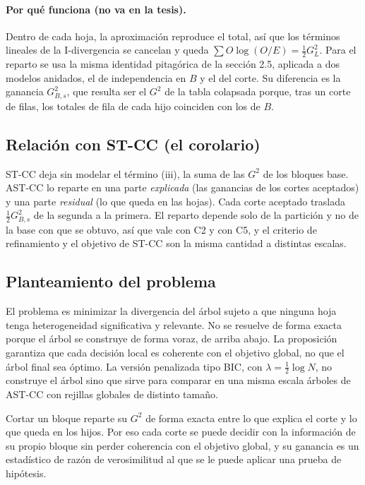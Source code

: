 \documentclass[11pt,a4paper]{article}
\newenvironment{idea}{\par\begin{center}\begin{lrbox}{\ideabox}\begin{minipage}{0.9\linewidth}}{\end{minipage}\end{lrbox}\fcolorbox{blue!40!black}{blue!5}{\usebox{\ideabox}}\end{center}}
\begin{document}
\paragraph{Por qué funciona (no va en la tesis).} Dentro de cada hoja, la
aproximación reproduce el total, así que los términos lineales de la I-divergencia
se cancelan y queda $\sum O\log(O/E)=\tfrac12G^2_L$. Para el reparto se usa la
misma identidad pitagórica de la sección 2.5, aplicada a dos modelos anidados, el
de independencia en $B$ y el del corte. Su diferencia es la ganancia
$G^2_{B,s}$, que resulta ser el $G^2$ de la tabla colapsada porque, tras un corte de
filas, los totales de fila de cada hijo coinciden con los de $B$.

\subsection{Relación con ST-CC (el corolario)}

ST-CC deja sin modelar el término (iii), la suma de las $G^2$ de los bloques base.
AST-CC lo reparte en una parte \emph{explicada} (las ganancias de los cortes
aceptados) y una parte \emph{residual} (lo que queda en las hojas). Cada corte
aceptado traslada $\tfrac12G^2_{B,s}$ de la segunda a la primera. El reparto
depende solo de la partición y no de la base con que se obtuvo, así que vale con C2
y con C5, y el criterio de refinamiento y el objetivo de ST-CC son la misma
cantidad a distintas escalas.

\subsection{Planteamiento del problema}

El problema es minimizar la divergencia del árbol sujeto a que ninguna hoja tenga
heterogeneidad significativa y relevante. No se resuelve de forma exacta porque el
árbol se construye de forma voraz, de arriba abajo. La proposición garantiza que
cada decisión local es coherente con el objetivo global, no que el árbol final sea
óptimo. La versión penalizada tipo BIC, con $\lambda=\tfrac12\log N$, no construye
el árbol sino que sirve para comparar en una misma escala árboles de AST-CC con
rejillas globales de distinto tamaño.

\begin{idea}
Cortar un bloque reparte su $G^2$ de forma exacta entre lo que explica el corte y lo
que queda en los hijos. Por eso cada corte se puede decidir con la información de
su propio bloque sin perder coherencia con el objetivo global, y su ganancia es un
estadístico de razón de verosimilitud al que se le puede aplicar una prueba de
hipótesis.
\end{idea}
\end{document}
